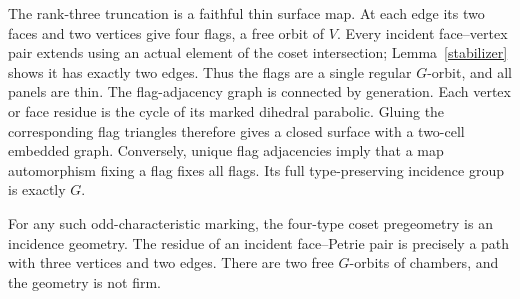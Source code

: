 \documentclass[11pt,a4paper]{article}
\begin{document}
The rank-three truncation is a faithful thin surface map. At each
edge its two faces and two vertices give four flags, a free orbit
of $V$. Every incident face--vertex pair extends using an actual
element of the coset intersection; Lemma~\ref{stabilizer} shows it
has exactly two edges. Thus the flags are a single regular $G$-orbit,
and all panels are thin. The flag-adjacency graph is connected by
generation. Each vertex or face residue is the cycle of its marked
dihedral parabolic. Gluing the corresponding flag triangles therefore
gives a closed surface with a two-cell embedded graph. Conversely,
unique flag adjacencies imply that a map automorphism fixing a flag
fixes all flags. Its full type-preserving incidence group is exactly $G$.

\begin{theorem}\label{completion}
For any such odd-characteristic marking, the four-type coset
pregeometry is an incidence geometry. The residue of an incident
face--Petrie pair is precisely a path with three vertices and two
edges. There are two free $G$-orbits of chambers, and the geometry
is not firm.
\end{theorem}
\end{document}
